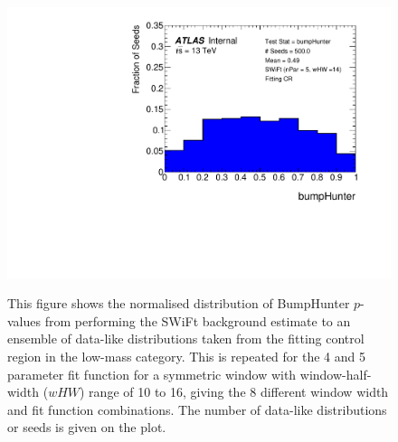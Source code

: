 \begin{figure}[!htb]
{}                                                                                              
 {                                                    
  \includegraphics[width=0.45\linewidth, angle=0]{figs/Dibjet/LowMass/FitStudy/pVal_bumpHunter_corrFitCR_5para_low14_high14.pdf}
}                                                                                              
\vspace{10pt}
\caption{\label{fig:bumpH_spuriousSignal}
  This figure shows the normalised distribution of {\sc BumpHunter} $p$-values from performing the SWiFt background estimate to an ensemble of
  data-like distributions taken from the fitting control region in the low-mass category.
  This is repeated for the 4 and 5 parameter fit function for a symmetric window with window-half-width ($wHW$) range of 10 to 16,
  giving the 8 different window width and fit function combinations.
  The number of data-like distributions or seeds is given on the plot.
}
\end{figure}

